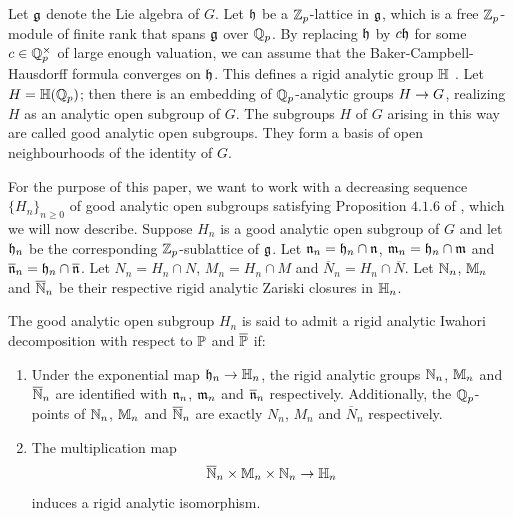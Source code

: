 \documentclass[10pt]{amsart}
\begin{document}
Let $\g$ denote the Lie algebra of $G$. Let $\H$ be a $\zp$-lattice in $\g$, which is a free $\zp$-module of finite rank that spans $\g$ over $\qp$. By replacing $\H$ by $c\H$ for some $c\in \q_{p}^{\times}$ of large enough valuation, we can assume that the Baker-Campbell-Hausdorff formula converges on $\H$. This defines a rigid analytic group $\h$ \cite[LG Ch. V, ]{Serre_CBH}. Let $H=\h(\qp)$; then there is an embedding of $\qp$-analytic groups $H\ra G$, realizing $H$ as an analytic open subgroup of $G$. The subgroups $H$ of $G$ arising in this way are called good analytic open subgroups. They form a basis of open neighbourhoods of the identity of $G$. 

For the purpose of this paper, we want to work with a decreasing sequence $\{H_{n}\}_{n\geq 0}$ of good analytic open subgroups satisfying Proposition  $4.1.6$ of \cite{Jacquet1}, which we will now describe. Suppose $H_{n}$ is a good analytic open subgroup of $G$ and let $\H_{n}$ be the corresponding $\zp$-sublattice of $\g$. Let $\N_{n}=\H_{n}\cap\N$, $\M_{n}=\H_{n}\cap\M$ and $\overline{\N}_{n}=\H_{n}\cap\overline{\N}$. Let $N_{n}=H_{n}\cap N$, $M_{n}=H_{n}\cap M$ and $\overline{N}_{n}=H_{n}\cap \overline{N}$. Let $\n_{n}$, $\m_{n}$ and $\overline{\n}_{n}$ be their respective rigid analytic Zariski closures in $\h_{n}$. 

\begin{definition}
The good analytic open subgroup $H_{n}$ is said to admit a rigid analytic Iwahori decomposition with respect to $\P$ and $\overline{\P}$ if:
\begin{enumerate}
    \item Under the exponential map $\H_{n}\ra \h_{n}$, the rigid analytic groups $\n_{n}$, $\m_{n}$ and $\overline{\n}_{n}$ are identified with $\N_{n}$, $\M_{n}$ and $\overline{\N}_{n}$ respectively. Additionally, the $\qp$-points of $\n_{n}$, $\m_{n}$ and $\overline{\n}_{n}$ are exactly $N_{n}$, $M_{n}$ and $\overline{N}_{n}$ respectively. 
    \item The multiplication map \[
       \overline{\n}_{n} \times \m_{n} \times  \n_{n} \ra \h_{n}
    \] induces a rigid analytic isomorphism. 
\end{enumerate}
\end{definition}

\end{document}
